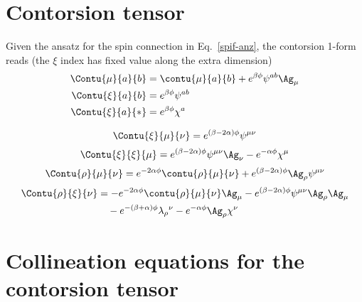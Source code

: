 \documentclass[aps,prd,12pt,superscriptaddress,showpacs,showkeys,reprint]{revtex4-1}
\begin{document}
\appendix

\section{Contorsion tensor}

Given the ansatz for the spin connection in Eq.~\eqref{spif-anz}, the contorsion 1-form reads (the $\xi$ index has fixed value along the extra dimension)
\begin{align}
  \Contu{\mu}{a}{b} &= \contu{\mu}{a}{b} + e^{\beta \phi} \psi^{ab} \Ag_\mu \\
  \Contu{\xi}{a}{b} &= e^{\beta \phi} \psi^{ab} \\
  \Contu{\xi}{a}{*} &= e^{\beta \phi} \chi^{a}
\end{align}

\begin{equation}
  \Contu{\xi}{\mu}{\nu} = e^{(\beta - 2\alpha)\phi} \psi^{\mu\nu}
\end{equation}
\begin{equation}
  \Contu{\xi}{\xi}{\mu} = e^{(\beta - 2\alpha)\phi} \psi^{\mu\nu} \Ag_\nu - e^{-\alpha \phi} \chi^\mu
\end{equation}
\begin{equation}
  \Contu{\rho}{\mu}{\nu} = e^{ - 2\alpha \phi} \contu{\rho}{\mu}{\nu} + e^{(\beta - 2\alpha)\phi} \Ag_\rho \psi^{\mu\nu}
\end{equation}
\begin{equation}
  \begin{split}
    \Contu{\rho}{\xi}{\nu} &= - e^{ - 2\alpha \phi} \contu{\rho}{\mu}{\nu} \Ag_\mu - e^{(\beta - 2\alpha)\phi} \psi^{\mu\nu} \Ag_\rho \Ag_\mu \\
    & \quad - e^{ - (\beta +\alpha) \phi} \lambda_\rho{}^\nu - e^{ - \alpha \phi} \Ag_\rho \chi^\nu
  \end{split}
\end{equation}

\section{Collineation equations for the contorsion tensor}
\end{document}
